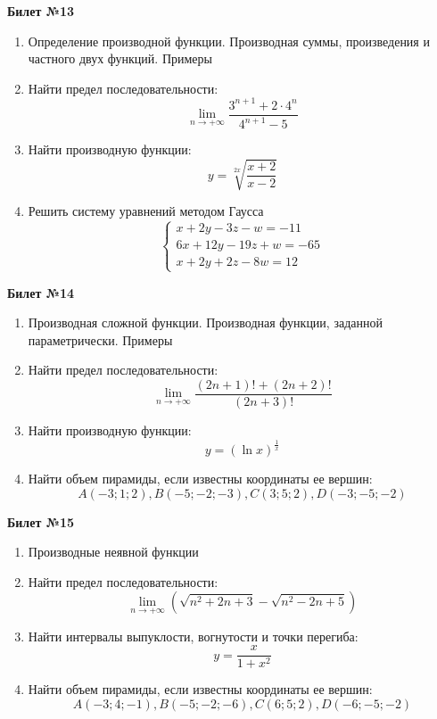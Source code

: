 \documentclass[a4paper, 12pt]{article}
\begin{document}
\begin{center}
    \textbf{Билет №13}
\end{center}
\begin{enumerate}
\item Определение производной функции. Производная суммы, произведения и частного двух функций. Примеры
\item Найти предел последовательности:  
\[\lim \limits_{n \to +\infty} \frac{3^{n+1} + 2 \cdot 4^n}{4^{n+1} - 5}\]
\item Найти производную функции: 
\[y = \sqrt[2x]{\frac{x + 2}{x - 2}}\]
\item Решить систему уравнений методом Гаусса
\[
	\begin{cases}
		x + 2y - 3z - w = -11 \\
		6x + 12y - 19z + w = -65 \\
		x + 2y + 2z - 8w = 12
	\end{cases}
\]
\end{enumerate}

\begin{center}
    \textbf{Билет №14}
\end{center}
\begin{enumerate}
\item Производная сложной функции.
Производная функции, заданной параметрически. Примеры
\item Найти предел последовательности:  
\[\lim \limits_{n \to +\infty} \frac{(2n + 1)! + (2n + 2)!}{(2n + 3)!}\]
\item Найти производную функции: 
\[y =  (\ln x)^{\frac{1}{x}}\]
\item Найти объем пирамиды, если известны координаты ее вершин:
\[A(-3;1;2), B(-5;-2;-3), C(3;5;2), D(-3;-5;-2)\]
\end{enumerate}

\begin{center}
    \textbf{Билет №15}
\end{center}
\begin{enumerate}
\item Производные неявной функции
\item Найти предел последовательности:  
\[\lim \limits_{n \to +\infty} (\sqrt{n^2 + 2n + 3} - \sqrt{n^2 - 2n + 5})\]
\item Найти интервалы выпуклости, вогнутости и точки перегиба:
\[y = \frac{x}{1+x^2}\]
\item Найти объем пирамиды, если известны координаты ее вершин:
\[A(-3;4;-1), B(-5;-2;-6), C(6;5;2), D(-6;-5;-2)\]
\end{enumerate}
\end{document}
